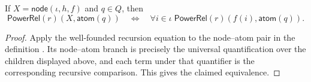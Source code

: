 \begin{lemma}
If $X=\mathsf{node}(\iota,h,f)$ and $q\in Q$, then
\[
\mathsf{PowerRel}(r)(X,\mathsf{atom}(q))
\quad\Longleftrightarrow\quad
\forall i\in\iota\;\mathsf{PowerRel}(r)(f(i),\mathsf{atom}(q)).
\]
\end{lemma}
\begin{proof}
Apply the well-founded recursion equation to the node--atom pair in the
definition .  Its node--atom branch is precisely the
universal quantification over the children displayed above, and each term
under that quantifier is the corresponding recursive comparison.  This
gives the claimed equivalence.
\end{proof}
